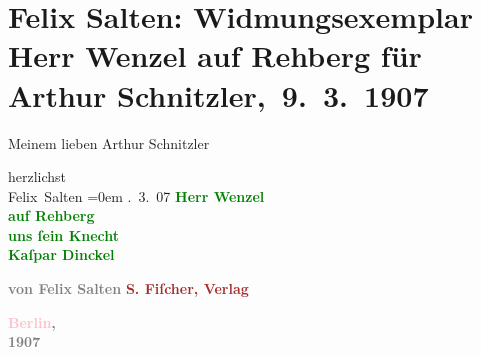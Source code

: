 

\renewcommand{\erwaehntePersonen}{Personen: Felix Salten}
\renewcommand{\erwaehnteInstitutionen}{Institutionen: S. Fischer Verlag}
\renewcommand{\erwaehnteOrte}{Orte: Berlin, Wien}
\renewcommand{\erwaehnteWerke}{Werke: Herr Wenzel auf Rehberg. Novelle}
\section[ Felix Salten: Widmungsexemplar Herr Wenzel auf Rehberg für Arthur Schnitzler, 9. 3. 1907]{Felix Salten: Widmungsexemplar Herr Wenzel auf Rehberg für Arthur
               Schnitzler, 9. 3. 1907}
\nopagebreak{}
\rehead{ }\normalsize\beginnumbering{}
\toendnotes[C]{\smallbreak\pagebreak[2]}
\pstart
           \noindent{}{\pb}Meinem lieben Arthur Schnitzler\pend
           
\pstart
           herzlichst{\\[\baselineskip]}\spacefill\mbox{Felix Salten}\pend
           \leftskip=0em{}
. 3. 07\pend
           {\bigskip}
\pstart
           \noindent{}\centering{}\textcolor{gray}{\textbf{\textcolor{green}{Herr Wenzel {\\}auf Rehberg {\\}uns ſein Knecht
                     {\\}Kaſpar Dinckel}{}\ledrightnote{\textcolor{green}{Herr Wenzel auf Rehberg. Novelle}}}}\pend
           
\pstart
           \noindent{}\centering{}\textcolor{gray}{\textbf{von Felix Salten}}\pend
           {\bigskip}
\pstart
           \noindent{}\centering{}\textcolor{gray}{\textbf{\textcolor{brown}{S. Fiſcher, Verlag}{}\ledrightnote{\textcolor{brown}{S. Fischer Verlag}}}}\pend
           
\pstart
           \noindent{}\centering{}\textcolor{gray}{\textbf{\textcolor{pink}{Berlin}{}\ledrightnote{\textcolor{pink}{Berlin}},}}{ }{\\}\textcolor{gray}{\textbf{1907}}\pend
           \endnumbering{}  
      